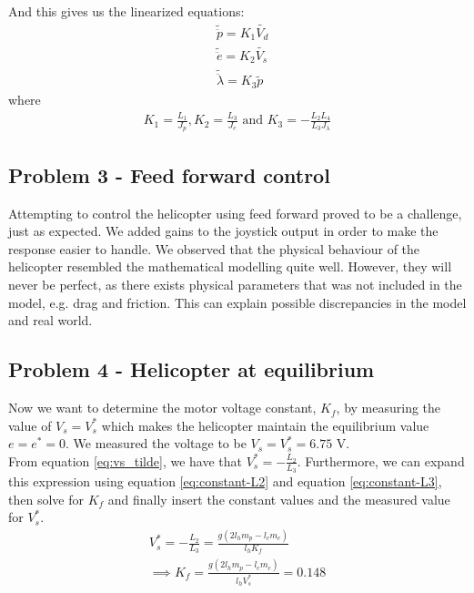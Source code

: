 And this gives us the linearized equations:
\begin{subequations} \label{eq:lin_model}
    \begin{align}
        &\tilde{\ddot{p}} = K_1 \tilde{V_d} \label{eq:lin_model_pitch}\\
        &\tilde{\ddot{e}} = K_2 \tilde{V_s} \label{eq:lin_model_elev}\\
        &\tilde{\ddot{\lambda}} = K_3 \tilde{p} \label{eq:lin_model_travel}
    \end{align}
\end{subequations}
where
\begin{gather}
    K_1 = \frac{L_1}{J_p}, K_2 = \frac{L_3}{J_e} \text{ and } K_3 = -\frac{L_2 L_4}{L_3 J_\lambda}
\end{gather}

\subsection{Problem 3 - Feed forward control}
Attempting to control the helicopter using feed forward proved to be a challenge, just as expected. We added gains to the joystick output in order to make the response easier to handle. We observed that the physical behaviour of the helicopter resembled the mathematical modelling quite well. However, they will never be perfect, as there exists physical parameters that was not included in the model, e.g. drag and friction. This can explain possible discrepancies in the model and real world.

\subsection{Problem 4 - Helicopter at equilibrium}
Now we want to determine the motor voltage constant, $K_f$, by measuring the value of $V_s = V_s^*$ which makes the helicopter maintain the equilibrium value $e = e^* = 0$. We measured the voltage to be $V_s = V_s^* = 6.75 \text{ V}$. 
\\From equation \eqref{eq:vs_tilde}, we have that $V_s^* = -\frac{L_2}{L_3}$. Furthermore, we can expand this expression using equation \eqref{eq:constant-L2} and equation \eqref{eq:constant-L3}, then solve for $K_f$ and finally insert the constant values and the measured value for $V_s^*$. 
\begin{gather}
    V_s^* = -\frac{L_2}{L_3} = \frac{g(2 l_h m_p - l_c m_c)}{l_h K_f}\nonumber\\
    \implies K_f = \frac{g(2 l_h m_p - l_c m_c)}{l_h V_s^*} = 0.148
\end{gather}